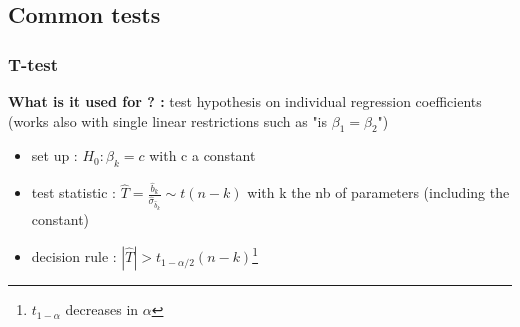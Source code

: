 \documentclass{article}
\begin{document}
\subsection{Common tests}

\subsubsection{T-test}
\begin{Tbox}
    \textbf{What is it used for ? :} test hypothesis on individual regression coefficients (works also with single linear restrictions such as "is $\beta_1=\beta_2$")
    \begin{itemize}
        \item set up : $H_0 : \beta_k = c$ with c a constant
        \item test statistic : $\hat{T} = \frac{\hat{b}_k}{\hat{\sigma}_{\hat{b}_k}} \sim t(n-k)$ with k the nb of parameters (including the constant)
        \item decision rule : $|\hat{T}|>t_{1-\alpha/2}(n-k)$\footnote{$t_{1-\alpha}$ decreases in $\alpha$}
    \end{itemize}
\end{Tbox}
\end{document}
